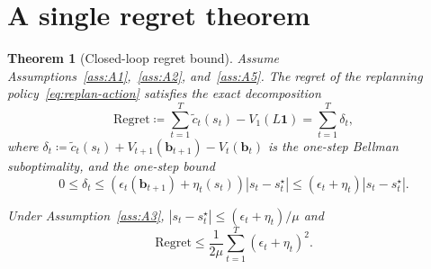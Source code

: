 \documentclass[11pt]{article}
\newtheorem{theorem}{Theorem}[section]
\newcommand{\1}{\mathbf{1}}
\newcommand{\eqdef}{\coloneqq}
\begin{document}

\section{A single regret theorem}
\label{sec:regret}%

\begin{theorem}[Closed-loop regret bound]
  \label{thm:main}%
  Assume Assumptions~\ref{ass:A1},~\ref{ass:A2}, and~\ref{ass:A5}.
  The regret of the replanning policy~\eqref{eq:replan-action} satisfies the exact decomposition
  \begin{equation*}
    \mathrm{Regret}
    \eqdef \sum_{t=1}^{T} \tilde{c}_t(s_t) - V_1(L\1)
    = \sum_{t=1}^{T} \delta_t,
  \end{equation*}
  where $\delta_t \eqdef \tilde{c}_t(s_t) + V_{t+1}(\mathbf{b}_{t+1}) - V_t(\mathbf{b}_t)$ is the one-step Bellman suboptimality, and the one-step bound
  \begin{equation*}
    0 \leq \delta_t \leq \left(\epsilon_t(\mathbf{b}_{t+1}) + \eta_t(s_t)\right)|s_t - s_t^{\star}|
    \leq (\epsilon_t + \eta_t)|s_t - s_t^{\star}|.
  \end{equation*}

  Under Assumption~\ref{ass:A3}, $|s_t - s_t^{\star}| \leq (\epsilon_t + \eta_t)/\mu$ and
  \begin{equation*}
    \mathrm{Regret} \leq \frac{1}{2\mu} \sum_{t=1}^{T} (\epsilon_t + \eta_t)^{2}.
  \end{equation*}
\end{theorem}
\end{document}
